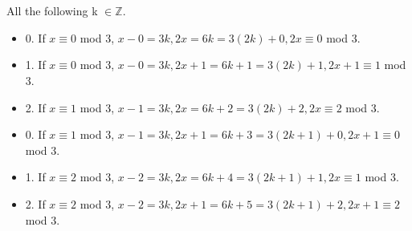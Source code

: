 \documentclass{article}
\begin{document}
    \section{}
        All the following k $\in \mathbb{Z}$.
        \begin{itemize}
            \item 0. If $x \equiv 0$ mod 3, $x - 0 = 3k, 2x = 6k = 3(2k) + 0, 2x \equiv 0$ mod 3.
            \item 1. If $x \equiv 0$ mod 3, $x - 0 = 3k, 2x + 1 = 6k + 1 = 3(2k) + 1, 2x + 1 \equiv 1$ mod 3.
            \item 2. If $x \equiv 1$ mod 3, $x - 1 = 3k, 2x = 6k + 2 = 3(2k) + 2, 2x \equiv 2$ mod 3.
            \item 0. If $x \equiv 1$ mod 3, $x - 1 = 3k, 2x + 1 = 6k + 3 = 3(2k + 1) + 0, 2x + 1 \equiv 0$ mod 3.
            \item 1. If $x \equiv 2$ mod 3, $x - 2 = 3k, 2x = 6k + 4 = 3(2k + 1) + 1, 2x \equiv 1$ mod 3.
            \item 2. If $x \equiv 2$ mod 3, $x - 2 = 3k, 2x + 1 = 6k + 5 = 3(2k + 1) + 2, 2x + 1 \equiv 2$ mod 3.
        \end{itemize}
    
\end{document}
